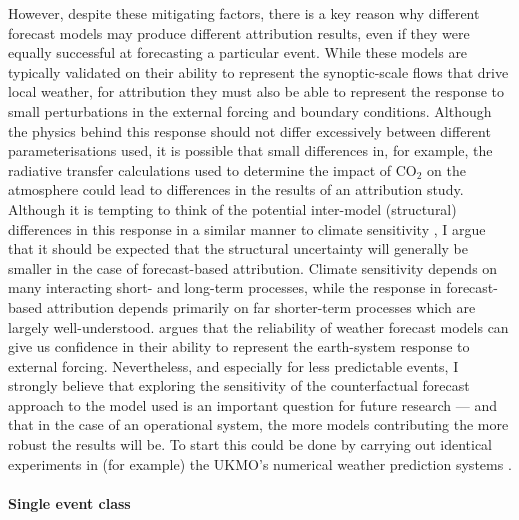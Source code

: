     \begin{mccorrection}
      However, despite these mitigating factors, there is a key reason why different forecast models may produce different attribution results, even if they were equally successful at forecasting a particular event. While these models are typically validated on their ability to represent the synoptic-scale flows that drive local weather, for attribution they must also be able to represent the response to small perturbations in the external forcing and boundary conditions. Although the physics behind this response should not differ excessively between different parameterisations used, it is possible that small differences in, for example, the radiative transfer calculations used to determine the impact of CO$_2$ on the atmosphere could lead to differences in the results of an attribution study. Although it is tempting to think of the potential inter-model (structural) differences in this response in a similar manner to climate sensitivity \citep{meehl_context_2020}, I argue that it should be expected that the structural uncertainty will generally be smaller in the case of forecast-based attribution. Climate sensitivity depends on many interacting short- and long-term processes, while the response in forecast-based attribution depends primarily on far shorter-term processes which are largely well-understood. \citet{palmer_simple_2018} argues that the reliability of weather forecast models can give us confidence in their ability to represent the earth-system response to external forcing. Nevertheless, and especially for less predictable events, I strongly believe that exploring the sensitivity of the counterfactual forecast approach to the model used is an important question for future research --- and that in the case of an operational system, the more models contributing the more robust the results will be. To start this could be done by carrying out identical experiments in (for example) the UKMO's numerical weather prediction systems \citep{walters_met_2017,maclachlan_global_2015}.
    \end{mccorrection}

  \paragraph*{Single event class}

